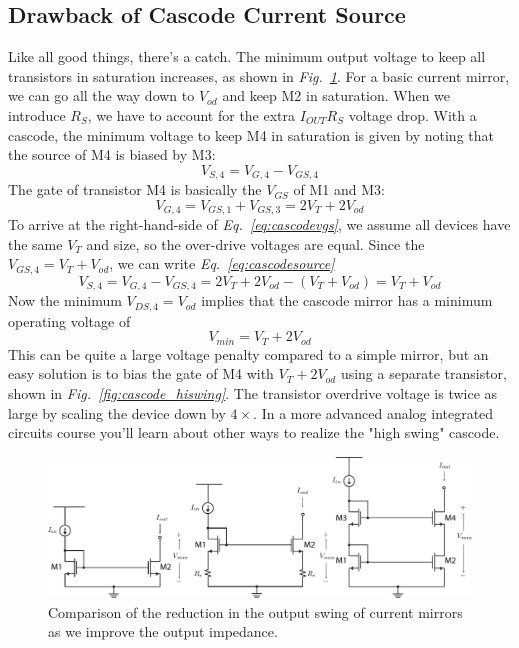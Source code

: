 \subsection{Drawback of Cascode Current Source}
Like all good things, there's a catch.  The minimum output voltage to keep all transistors in saturation increases, as shown in \emph{Fig.~\ref{fig:mirrors_vmin}}.  For a basic current mirror, we can go all the way down to $V_{od}$ and keep M2 in saturation.  When we introduce $R_S$, we have to account for the extra $I_{OUT} R_S$ voltage drop.  With a cascode, the minimum voltage to keep M4 in saturation is given by noting that the source of M4 is biased by M3:
    \begin{equation}
        V_{S,4} = V_{G,4} - V_{GS,4}
        \label{eq:cascodesource}
    \end{equation}
The gate of transistor M4 is basically the $V_{GS}$ of M1 and M3:
    \begin{equation}
        V_{G,4} = V_{GS,1} + V_{GS,3} = 2 V_T + 2 V_{od}
        \label{eq:cascodevgs}
    \end{equation}
To arrive at the right-hand-side of \emph{Eq.~\ref{eq:cascodevgs}}, we assume all devices have the same $V_T$ and size, so the over-drive voltages are equal.  Since the $V_{GS,4} = V_T + V_{od}$, we can write \emph{Eq.~\ref{eq:cascodesource}}
    \begin{equation}
        V_{S,4} = V_{G,4} - V_{GS,4}   = 2 V_T + 2 V_{od} - ( V_T + V_{od} ) = V_T + V_{od}
    \end{equation}
Now the minimum $V_{DS,4} = V_{od}$ implies that the cascode mirror has a minimum operating voltage of
    \begin{equation}
        V_{min} = V_T + 2 V_{od}
    \end{equation}
This can be quite a large voltage penalty compared to a simple mirror, but an easy solution is to bias the gate of M4 with $V_T + 2 V_{od}$ using a separate transistor, shown in \emph{Fig.~\ref{fig:cascode_hiswing}}.  The transistor overdrive voltage is twice as large by scaling the device down by $4\times$.  In a more advanced analog integrated circuits course you'll learn about other ways to realize the "high swing" cascode.
\begin{figure}[tb]
\centering
\includegraphics[width=\columnwidth]{mirrors_vmin}
\caption{Comparison of the reduction in the output swing of current mirrors as we improve the output impedance.}
\label{fig:mirrors_vmin}
\end{figure}
